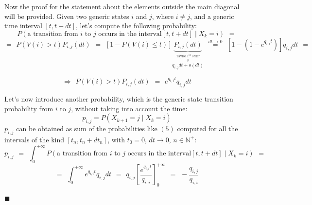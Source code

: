 \documentclass[12pt,a4paper]{article}
\begin{document}
\bigskip\noindent
Now the proof for the statement about the elements outside the main diagonal will be provided. Given two generic states $i$ and $j$, where $i\neq j$, and a generic time interval $\left[ t, t+dt\right]$, let's compute the following probability:
\begin{equation}
P\left( \textrm{a transition from }i\textrm{ to }j 
\textrm{ occurs in the interval} \left[ t, t+dt\right]
 \mid 
X_k=i
\right)
\hspace{5pt}
=
\end{equation}
$$
=
\hspace{5pt}
P\left( V(i)>t\right)
P_{i,j}(dt)
\hspace{5pt}
=
\hspace{5pt}
\left[1-P\left( V(i)\leq t\right)\right]
\underbrace{P_{i,j}(dt)}_{
\overset{\textrm{Taylor }1^{\textrm{st}}\textrm{ order}}
{\overset{\Downarrow}{q_{i,j}dt+o(dt)}}}
\hspace{5pt}
\overset{dt\rightarrow 0}{=}
\hspace{5pt}
\left[1-\left(1-e^{q_{i,i} t}\right)\right]q_{i,j}dt
\hspace{5pt}
=
$$
\begin{large}
$$
\Rightarrow
\hspace{5pt}
P\left( V(i)>t\right)
P_{i,j}(dt)
\hspace{5pt}
=
\hspace{5pt}
e^{q_{i,i} t}q_{i,j}dt
$$
\end{large}

\noindent 
Let's now introduce another probability, which is the generic state transition probability from $i$ to $j$, without taking into account the time:
$$
p_{i,j}=P(X_{k+1}=j  \mid  X_k=i)
$$
$p_{i,j}$ can be obtained as sum of the probabilities like $(5)$ computed for all the intervals of the kind 
$[t_n,t_n+dt_n]$, with $t_0=0$, $dt \rightarrow 0$, $n\in \mathbb{N}^+$:
$$
p_{i,j}
\hspace{5pt}
=
\hspace{5pt}
\int_0^{+\infty}{P\left( \textrm{a transition from }i\textrm{ to }j 
\textrm{ occurs in the interval} \left[ t, t+dt\right]
 \mid 
X_k=i
\right)} 
\hspace{5pt}
=
$$
$$
=
\hspace{5pt}
\int_0^{+\infty}{
e^{q_{i,i} t}q_{i,j}dt
}
\hspace{5pt}
=
\hspace{5pt}
q_{i,j}\left[ \frac{e^{q_{i,i}t}}{q_{i,i}}\right]_0^{+\infty}
\hspace{5pt}
=
\hspace{5pt}
-\frac{q_{i,j}}{q_{i,i}}
$$
\begin{flushright}
$\blacksquare$
\end{flushright}
\newpage
\end{document}
